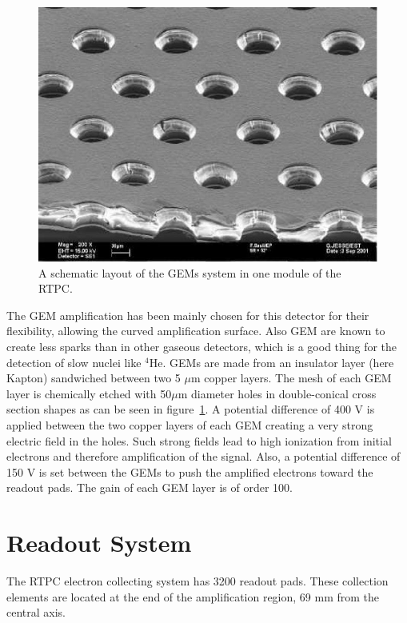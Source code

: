 \documentclass[aps,prl,twocolumn,showpacs,superscriptaddress,groupedaddress]{revtex4}
\begin{document}
\begin{figure}[tb]
\centering
\includegraphics[scale=0.70]{fig/GEM_photo.jpg}
\caption[]{A schematic layout of the GEMs system in one module of the RTPC.} 
\label{fig:GEMs}
\end{figure}

The GEM amplification has been mainly chosen for this detector for their 
flexibility, allowing the curved amplification surface. Also GEM are known to 
create less sparks than in other gaseous detectors, which is a good thing for 
the detection of slow nuclei like $^4$He. GEMs are made from an insulator layer 
(here Kapton) sandwiched between two 5 $\mu$m copper layers. The mesh of each 
GEM layer is chemically etched with 50$\mu$m diameter holes in double-conical 
cross section shapes as can be seen in figure~\ref{fig:GEMs}. A potential 
difference of 400 V is applied between the two copper layers of each GEM 
creating a very strong electric field in the holes. Such strong fields lead to 
high ionization from initial electrons and therefore amplification of the 
signal. Also, a potential difference of 150 V is set between the GEMs to push 
the amplified electrons toward the readout pads. The gain of each GEM layer is 
of order 100.\\

\section{Readout System} \label{sec_readout}
The RTPC electron collecting system has 3200 readout pads. These collection 
elements are located at the end of the amplification region, 69 mm from the 
central axis.
\end{document}
